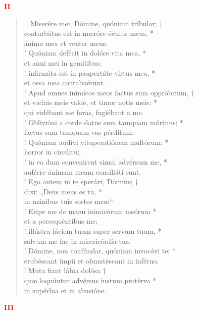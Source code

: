 \begin{center}
\textcolor{red}{\bf II}
\end{center}
\begin{verse}[\versewidth]
Miserére mei, Dómine, quóniam tríbulor; †\\
conturbátus est in mæróre óculus meus, *\\
ánima mea et venter meus.\\!
\vin Quóniam defécit in dolóre vita mea, *\\
\vin et anni mei in gemítibus;\\!
infirmáta est in paupertáte virtus mea, *\\
et ossa mea contabuérunt.\\!
\vin Apud omnes inimícos meos factus sum oppróbrium, †\\
\vin et vicínis meis valde, et timor notis meis: *\\
\vin qui vidébant me foras, fugiébant a me.\\!
Oblivióni a corde datus sum tamquam mórtuus; *\\
factus sum tamquam vas pérditum.\\!
\vin Quóniam audívi vituperatiónem multórum: *\\
\vin horror in circúitu;\\!
in eo dum convenírent simul advérsum me, *\\
auférre ánimam meam consiliáti sunt.\\!
\vin Ego autem in te sperávi, Dómine; †\\
\vin dixi: „Deus meus es tu, *\\
\vin in mánibus tuis sortes meæ.“\\!
Eripe me de manu inimicórum meórum *\\
et a persequéntibus me;\\!
\vin illústra fáciem tuam super servum tuum, *\\
\vin salvum me fac in misericórdia tua.\\!
Dómine, non confúndar, quóniam invocávi te; *\\
erubéscant ímpii et obmutéscant in inférno.\\!
\vin Muta fiant lábia dolósa †\\
\vin quæ loquúntur advérsus iustum protérva *\\
in supérbia et in abusióne.\\
\end{verse}
\begin{center}
\textcolor{red}{\bf III}
\end{center}
